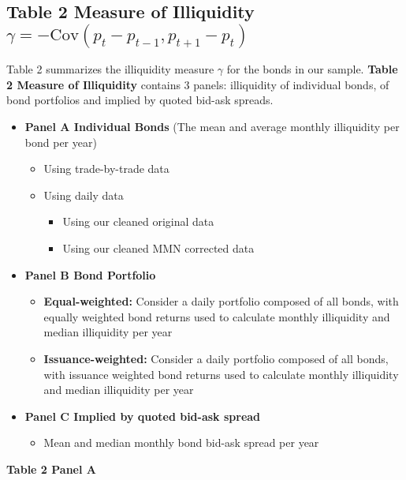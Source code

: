 \documentclass{article}
\begin{document}
\subsection{Table 2 Measure of Illiquidity $ \gamma = -\text{Cov}(p_t - p_{t-1}, p_{t+1} - p_t) $ }


Table 2 summarizes the illiquidity measure $\gamma$ for the bonds in our sample. \textbf{Table 2 Measure of Illiquidity} contains 3 panels: illiquidity of individual bonds, of bond portfolios and implied by quoted bid-ask spreads.

\begin{itemize}
    \item \textbf{Panel A Individual Bonds} (The mean and average monthly illiquidity per bond per year)
    \begin{itemize}
        \item Using trade-by-trade data
        \item Using daily data
        \begin{itemize}
            \item Using our cleaned original data
            \item Using our cleaned MMN corrected data
        \end{itemize}
    \end{itemize}
    
    \item \textbf{Panel B Bond Portfolio}
    \begin{itemize}
        \item \textbf{Equal-weighted:} Consider a daily portfolio composed of all bonds, with equally weighted bond returns used to calculate monthly illiquidity and median illiquidity per year
        \item \textbf{Issuance-weighted:} Consider a daily portfolio composed of all bonds, with issuance weighted bond returns used to calculate monthly illiquidity and median illiquidity per year
    \end{itemize}
    
    \item \textbf{Panel C Implied by quoted bid-ask spread}
    \begin{itemize}
        \item Mean and median monthly bond bid-ask spread per year
    \end{itemize}
\end{itemize}


\noindent\textbf{\small Table 2 Panel A}
\end{document}
